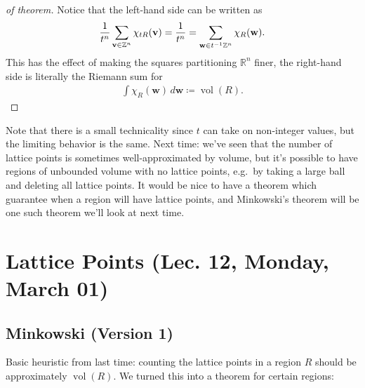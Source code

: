 \begin{proof}[of theorem]

Notice that the left-hand side can be written as
\begin{align*}
{1\over t^n} \sum_{\mathbf{v} \in {\mathbb{Z}}^n} \chi_{tR} (\mathbf{v})
=
{1\over t^n} = \sum_{\mathbf{w} \in t^{-1}{\mathbb{Z}}^n} \chi_R(\mathbf{w})
.\end{align*}
This has the effect of making the squares partitioning
\({\mathbb{R}}^n\) finer, the right-hand side is literally the Riemann
sum for
\begin{align*}
\int \chi_R(\mathbf{w}) \,d \mathbf{w} \coloneqq\operatorname{vol}(R)
.\end{align*}

\end{proof}

\begin{remark}

Note that there is a small technicality since \(t\) can take on
non-integer values, but the limiting behavior is the same. Next time:
we've seen that the number of lattice points is sometimes
well-approximated by volume, but it's possible to have regions of
unbounded volume with no lattice points, e.g.~by taking a large ball and
deleting all lattice points. It would be nice to have a theorem which
guarantee when a region will have lattice points, and Minkowski's
theorem will be one such theorem we'll look at next time.

\end{remark}

\hypertarget{lattice-points-lec.-12-monday-march-01}{%
\section{Lattice Points (Lec. 12, Monday, March
01)}\label{lattice-points-lec.-12-monday-march-01}}

\hypertarget{minkowski-version-1}{%
\subsection{Minkowski (Version 1)}\label{minkowski-version-1}}

\begin{remark}

Basic heuristic from last time: counting the lattice points in a region
\(R\) should be approximately \(\operatorname{vol}(R)\). We turned this
into a theorem for certain regions:

\end{remark}

